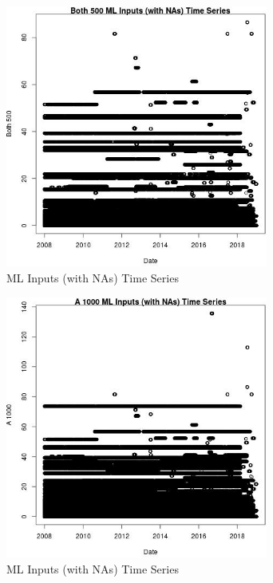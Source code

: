 \begin{figure} 
\centering  
\includegraphics[width=0.77\textwidth]{Code_Outputs/Report_ML_input_PM25_Step4_part_e_de_duplicated_aves_compiled_2019-05-21wNAs_Both_500vDate.jpg} 
\caption{\label{fig:Report_ML_input_PM25_Step4_part_e_de_duplicated_aves_compiled_2019-05-21wNAsBoth_500vDate}ML Inputs (with NAs) Time Series} 
\end{figure} 
 

\clearpage 

\begin{figure} 
\centering  
\includegraphics[width=0.77\textwidth]{Code_Outputs/Report_ML_input_PM25_Step4_part_e_de_duplicated_aves_compiled_2019-05-21wNAs_A_1000vDate.jpg} 
\caption{\label{fig:Report_ML_input_PM25_Step4_part_e_de_duplicated_aves_compiled_2019-05-21wNAsA_1000vDate}ML Inputs (with NAs) Time Series} 
\end{figure} 
 

